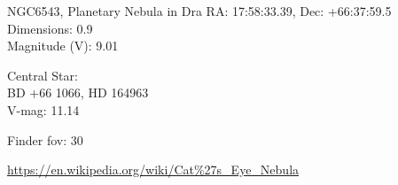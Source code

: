 \begin{block}{NGC6543, Planetary Nebula in Dra}
    RA: 17:58:33.39, Dec: +66:37:59.5 \\ 
    Dimensions: 0.9 \\ 
    Magnitude (V): 9.01

    Central Star: \\ 
      \hspace{1em}BD +66 1066, HD 164963 \\ 
      \hspace{1em}V-mag: 11.14 


    Finder fov: 30 

    \url{https://en.wikipedia.org/wiki/Cat%27s_Eye_Nebula} 
\end{block}